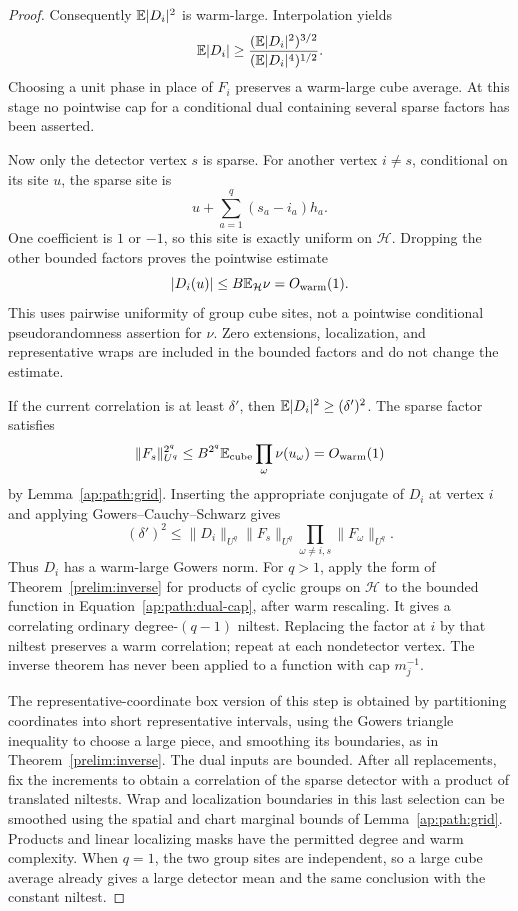 \begin{proof}
Consequently $\mathbb E|D_i|^2$ is warm-large.  Interpolation yields
\[
 \mathbb E|D_i|\ge
 \frac{(\mathbb E|D_i|^2)^{3/2}}{(\mathbb E|D_i|^4)^{1/2}}.
\]
Choosing a unit phase in place of $F_i$ preserves a warm-large
cube average.  At this stage no pointwise cap for a conditional
dual containing several sparse factors has been asserted.

Now only the detector vertex $s$ is sparse.  For another vertex
$i\ne s$, conditional on its site $u$, the sparse site is
\[
 u+\sum_{a=1}^q(s_a-i_a)h_a.
\]
One coefficient is $1$ or $-1$, so this site is exactly uniform
on $\mathcal H$.  Dropping the other bounded factors proves
the pointwise estimate
\begin{equation}\label{ap:path:dual-cap}
 |D_i(u)|\le B\mathbb E_{\mathcal H}\nu=O_{\rm warm}(1).
\end{equation}
This uses pairwise uniformity of group cube sites, not a
pointwise conditional pseudorandomness assertion for $\nu$.
Zero extensions, localization, and representative wraps are
included in the bounded factors and do not change the estimate.

If the current correlation is at least $\delta'$, then
$\mathbb E|D_i|^2\ge(\delta')^2$.  The sparse factor satisfies
\[
 \|F_s\|_{U^q}^{2^q}
 \le B^{2^q}\mathbb E_{\rm cube}\prod_\omega\nu(u_\omega)
 =O_{\rm warm}(1)
\]
by Lemma~\ref{ap:path:grid}.  Inserting the appropriate conjugate
of $D_i$ at vertex $i$ and applying Gowers--Cauchy--Schwarz gives
\[
 (\delta')^2\le \|D_i\|_{U^q}\|F_s\|_{U^q}
                    \prod_{\omega\ne i,s}\|F_\omega\|_{U^q}.
\]
Thus $D_i$ has a warm-large Gowers norm. For $q>1$, apply the form of
Theorem~\ref{prelim:inverse} for products of cyclic groups on
$\mathcal H$ to the bounded function in
Equation~\eqref{ap:path:dual-cap}, after warm rescaling.  It
gives a correlating ordinary degree-$(q-1)$ niltest.  Replacing
the factor at $i$ by that niltest preserves a warm correlation;
repeat at each nondetector vertex.  The inverse theorem has
never been applied to a function with cap $m_j^{-1}$.

The representative-coordinate box version of this step is
obtained by partitioning coordinates into short representative
intervals, using the Gowers triangle inequality to choose a
large piece, and smoothing its boundaries, as in
Theorem~\ref{prelim:inverse}.  The dual inputs are bounded.
After all replacements, fix the increments to obtain a
correlation of the sparse detector with a product of translated
niltests.  Wrap and localization boundaries in this last
selection can be smoothed using the spatial and chart marginal
bounds of Lemma~\ref{ap:path:grid}.  Products and linear
localizing masks have the permitted degree and warm complexity.
When $q=1$, the two group sites are independent, so a large
cube average already gives a large detector mean and the same
conclusion with the constant niltest.


\end{proof}
